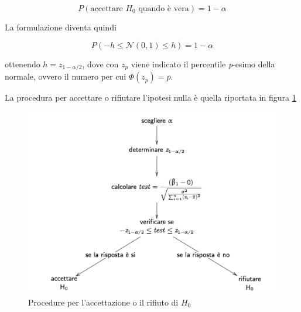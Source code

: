 $$
P(\text{accettare } H_0 \text{ quando è vera}) = 1 - \alpha
$$ 

La formulazione diventa quindi

$$
P(-h \leq \mathcal{N}(0,1) \leq h) = 1 - \alpha
$$

ottenendo $ h = z_{1 - \alpha/2} $, dove con $ z_p $ viene indicato il percentile \textit{p}-esimo della normale, ovvero il numero per cui $ \Phi(z_p) = p$.

La procedura per accettare o rifiutare l'ipotesi nulla è quella riportata in figura \ref{fig:ipotesi-1}


\begin{figure}[htbp]
	\centering
	\includegraphics[width = .8\textwidth]{./notes/immagini/l5-fig3-1.png}
	\caption{Procedure per l'accettazione o il rifiuto di $ H_0 $}\label{fig:ipotesi-1}
\end{figure}



